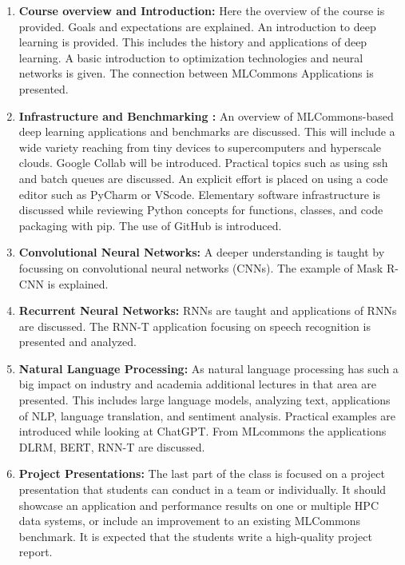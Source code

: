 \documentclass[utf8]{FrontiersinVancouver} %
\begin{document}
\begin{enumerate}
  
\item{\bf Course overview and Introduction:} Here the overview of the
  course is provided. Goals and expectations are explained. An
  introduction to deep learning is provided. This includes the history
  and applications of deep learning. A basic introduction to
  optimization technologies and neural networks is given. The
  connection between MLCommons Applications is presented.

\item{\bf Infrastructure and Benchmarking :} An overview of
  MLCommons-based deep learning applications and benchmarks are
  discussed. This will include a wide variety reaching from tiny
  devices to supercomputers and hyperscale clouds. Google Collab will
  be introduced. Practical topics such as using ssh and batch queues
  are discussed. An explicit effort is placed on using a code editor
  such as PyCharm or VScode. Elementary software infrastructure is
  discussed while reviewing Python concepts for functions, classes,
  and code packaging with pip. The use of GitHub is introduced.
  
\item{\bf Convolutional Neural Networks:} A deeper understanding is taught
  by focussing on convolutional neural networks (CNNs). The example of
  Mask R-CNN is explained.

\item{\bf Recurrent Neural Networks:} RNNs are taught and applications of
  RNNs are discussed. The RNN-T application focusing on speech
  recognition is presented and analyzed.

\item{\bf Natural Language Processing:} As natural language processing
  has such a big impact on industry and academia additional lectures
  in that area are presented. This includes large language models,
  analyzing text, applications of NLP, language translation, and
  sentiment analysis.  Practical examples are introduced while looking
  at ChatGPT. From MLcommons the applications DLRM, BERT, RNN-T are
  discussed.

\item{\bf Project Presentations:} The last part of the class is
  focused on a project presentation that students can conduct in a
  team or individually. It should showcase an application and
  performance results on one or multiple HPC data systems, or include
  an improvement to an existing MLCommons benchmark. It is expected
  that the students write a high-quality project report.
  
 \end{enumerate}
\end{document}
